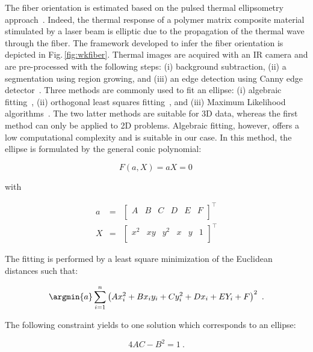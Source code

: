 The fiber orientation is estimated based on the pulsed thermal ellipsometry approach~\cite{Cielo1987}.
Indeed, the thermal response of a polymer matrix composite material stimulated by a laser beam is elliptic due to the propagation of the thermal wave through the fiber.
The framework developed to infer the fiber orientation is depicted in Fig.\,\ref{fig:wkfiber}.
Thermal images are acquired with an IR camera and are pre-processed with the following steps: (i) background subtraction, (ii) a segmentation using region growing, and (iii) an edge detection using Canny edge detector~\cite{Canny1986}. %
Three methods are commonly used to fit an ellipse: (i) algebraic fitting~\cite{Fitzgibbon1999}, (ii) orthogonal least squares fitting~\cite{Ahn2001}, and (iii) Maximum Likelihood algorithms~\cite{Chojnacki2000}. 
The two latter methods are suitable for 3D data, whereas the first method can only be applied to 2D problems.
Algebraic fitting, however, offers a low computational complexity and is suitable in our case.
In this method, the ellipse is formulated by the general conic polynomial:

\begin{equation}
  \label{eq:4}
  F(a, X) = aX = 0 \,
\end{equation}

\noindent with 

\begin{eqnarray}
  a & = & \begin{bmatrix} A & B & C & D & E & F \\ \end{bmatrix}^\intercal \nonumber\\
  X & = & \begin{bmatrix} x^2 & xy & y^2 & x & y & 1 \\ \end{bmatrix}^\intercal \nonumber
\end{eqnarray}

The fitting is performed by a least square minimization of the Euclidean distances such that:

\begin{equation}
  \argmin{a} \sum_{i=1}^{n} \left( A x_i^2 + B x_i y_i + C y_i^2 + D x_i + E Y_i + F \right)^2 \ .
\end{equation}

The following constraint yields to one solution which corresponds to an ellipse:

\begin{equation}
  4AC - B^2 = 1 \ .
\end{equation}


